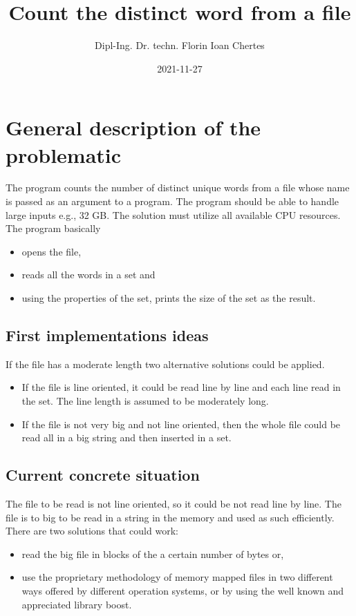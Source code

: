 \documentclass{article}
\title{Count the distinct word from a file}
\date{2021-11-27}
\author{Dipl-Ing. Dr. techn. Florin Ioan Chertes}
\begin{document}
\maketitle
{}
\newpage
{}

\section{General description of the problematic}

The program counts the number of distinct unique words from a file whose name is passed as an argument to a program. The program should be able to handle large inputs e.g., 32 GB. The solution must utilize all available CPU resources.
The program basically

\begin{itemize}
	\item opens the file,
	\item reads all the words in a set and
	\item using the properties of the set, prints the size of the set as the result.
\end{itemize}

\subsection{First implementations ideas}
If the file has a moderate length two alternative solutions could be applied. 
\begin{itemize}
	\item If the file is line oriented, it could be read line by line and each line read in the set. The line length is assumed to be moderately long. 
	\item If the file is not very big and not line oriented, then the whole file could be read all in a big string and then inserted in a set.
\end{itemize}

\subsection{Current concrete situation}

The file to be read is not line oriented, so it could be not read line by line. The file is to big to be read in a string in the memory and used as such efficiently. There are two solutions that could work:

\begin{itemize}
	\item read the big file in blocks of the a certain number of bytes or,
	\item use the proprietary methodology of memory mapped files in two different ways
	\subitem offered by different operation systems, or 
	\subitem by using the well known and appreciated library boost.
\end{itemize}
\end{document}
